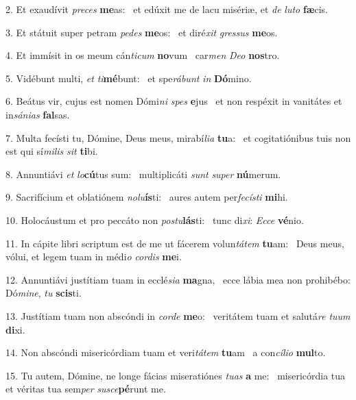 2. Et exaudívit \textit{pre}\textit{ces} \textbf{me}as: \ast\  et edúxit me de lacu misériæ, et \textit{de} \textit{lu}\textit{to} \textbf{fæ}cis.\

3. Et státuit super petram \textit{pe}\textit{des} \textbf{me}os: \ast\  et diré\textit{xit} \textit{gres}\textit{sus} \textbf{me}os.\

4. Et immísit in os meum cán\textit{ti}\textit{cum} \textbf{no}vum \ast\  car\textit{men} \textit{De}\textit{o} \textbf{nos}tro.\

5. Vidébunt multi, \textit{et} \textit{ti}\textbf{mé}bunt: \ast\  et spe\textit{rá}\textit{bunt} \textit{in} \textbf{Dó}mino.\

6. Beátus vir, cujus est nomen Dómi\textit{ni} \textit{spes} \textbf{e}jus \ast\  et non respéxit in vanitátes et in\textit{sá}\textit{ni}\textit{as} \textbf{fal}sas.\

7. Multa fecísti tu, Dómine, Deus meus, mirabí\textit{li}\textit{a} \textbf{tu}a: \ast\  et cogitatiónibus tuis non est qui sí\textit{mi}\textit{lis} \textit{sit} \textbf{ti}bi.\

8. Annuntiávi \textit{et} \textit{lo}\textbf{cú}tus sum: \ast\  multiplicáti \textit{sunt} \textit{su}\textit{per} \textbf{nú}merum.\

9. Sacrifícium et oblatiónem \textit{no}\textit{lu}\textbf{ís}ti: \ast\  aures autem per\textit{fe}\textit{cís}\textit{ti} \textbf{mi}hi.\

10. Holocáustum et pro peccáto non \textit{pos}\textit{tu}\textbf{lás}ti: \ast\  tunc di\textit{xi}: \textit{Ec}\textit{ce} \textbf{vé}nio.\

11. In cápite libri scriptum est de me ut fácerem volun\textit{tá}\textit{tem} \textbf{tu}am: \ast\  Deus meus, vólui, et legem tuam in médi\textit{o} \textit{cor}\textit{dis} \textbf{me}i.\

12. Annuntiávi justítiam tuam in ecclé\textit{si}\textit{a} \textbf{ma}gna, \ast\  ecce lábia mea non prohibébo: Dó\textit{mi}\textit{ne}, \textit{tu} \textbf{scis}ti.\

13. Justítiam tuam non abscóndi in \textit{cor}\textit{de} \textbf{me}o: \ast\  veritátem tuam et salutá\textit{re} \textit{tu}\textit{um} \textbf{di}xi.\

14. Non abscóndi misericórdiam tuam et veri\textit{tá}\textit{tem} \textbf{tu}am \ast\  a con\textit{cí}\textit{li}\textit{o} \textbf{mul}to.\

15. Tu autem, Dómine, ne longe fácias miseratiónes \textit{tu}\textit{as} \textbf{a} me: \ast\  misericórdia tua et véritas tua sem\textit{per} \textit{su}\textit{sce}\textbf{pé}runt me.\

